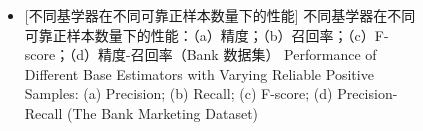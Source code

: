 \begin{figure}[!htbp]  %
    \centering  %
    \vspace{0.5cm} %
    \captionsetup{size=footnotesize}  %
    
    
    
    
    
    \begin{itemize}[leftmargin=1.6cm,rightmargin=1.6cm]
        \item[\quad] \bicaption
            [\xiaosi 不同基学器在不同可靠正样本数量下的性能]
            {\centering \songti \wuhao 不同基学器在不同可靠正样本数量下的性能：（a）精度；（b）召回率；（c）F-score；（d）精度-召回率（Bank 数据集）}
            {\centering \wuhao Performance of Different Base Estimators with Varying Reliable Positive Samples: (a) Precision; (b) Recall; (c) F-score; (d) Precision-Recall (The Bank Marketing Dataset)}
    \end{itemize}
    
    \label{RQ2.1}  %
\end{figure}  %







